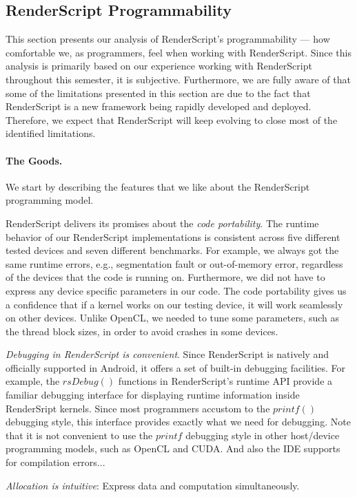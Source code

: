 \subsection{RenderScript Programmability}
This section presents our analysis of RenderScript's programmability --- how
comfortable we, as programmers, feel when working with RenderScript. Since this
analysis is primarily based on our experience working with RenderScript
throughout this semester, it is subjective. Furthermore, we are fully aware of
that some of the limitations presented in this section are due to the fact that
RenderScript is a new framework being rapidly developed and deployed.
Therefore, we expect that RenderScript will keep evolving to close most of the
identified limitations.

\paragraph{The Goods.}
We start by describing the features that we like about the RenderScript
programming model.

RenderScript delivers its promises about the \textit{code portability}.
The runtime behavior of our RenderScript implementations is consistent across
five different tested devices and seven different benchmarks. For example, we
always got the same runtime errors, e.g., segmentation fault or out-of-memory
error, regardless of the devices that the code is running on. Furthermore, we
did not have to express any device specific parameters in our code. The code
portability gives us a confidence that if a kernel works on our testing device,
it will work seamlessly on other devices. Unlike OpenCL, we needed to tune some
parameters, such as the thread block sizes, in order to avoid crashes in some
devices.

\textit{Debugging in RenderScript is convenient}. Since RenderScript is natively
and officially supported in Android, it offers a set of built-in debugging
facilities. For example, the $rsDebug()$ functions in RenderScript's runtime API
provide a familiar debugging interface for displaying runtime information inside
RenderSript kernels. Since most programmers accustom to the $printf()$ debugging
style, this interface provides exactly what we need for debugging. Note that it
is not convenient to use the $printf$ debugging style in other host/device
programming models, such as OpenCL and CUDA. And also the IDE supports for
compilation errors...

\textit{Allocation is intuitive}: Express data and computation simultaneously.

